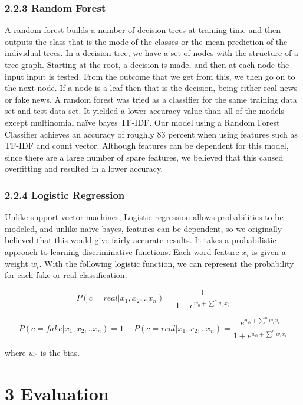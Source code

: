 \documentclass{neu_handout}
\begin{document}
\subsubsection*{2.2.3 Random Forest}

A random forest builds a number of decision trees at training time and then outputs the class that is the mode of the classes or the mean prediction of the individual trees. In a decision tree, we have a set of nodes with the structure of a tree graph. Starting at the root, a decision is made, and then at each node the input input is tested. From the outcome that we get from this, we then go on to the next node. If a node is a leaf then that is the decision, being either real news or fake news. A random forest was tried as a classifier for the same training data set and test data set. It
yielded a lower accuracy value than all of the models except multinomial na\"ive bayes TF-IDF. Our model using a Random Forest Classifier achieves an accuracy of roughly 83 percent when using features such as TF-IDF and count vector. Although features can be dependent for this model, since there are a large number of spare features, we believed that this caused overfitting and resulted in a lower accuracy.
 
 
\subsubsection*{2.2.4 Logistic Regression}
Unlike support vector machines, Logistic regression allows probabilities to be modeled, and unlike na\"ive bayes, features can be dependent, so we originally believed that this would give fairly accurate results. It takes a probabilistic approach to learning discriminative functions. Each word feature $x_i$ is given a weight $w_i$. With the following logistic function, we can represent the probability for each fake or real classification:

$$P(c = real | x_1, x_2,..x_n) = \frac{1}{1 + e^{w_0 + \sum^n w_i x_i}} $$

$$P(c = fake | x_1, x_2,..x_n) = 1 - P(c = real | x_1, x_2,..x_n) = \frac{e^{w_0 + \sum^n w_i x_i}}{1+e^{w_0 + \sum^n w_i x_i}}$$

where $w_0$ is the bias.

\section*{3 Evaluation}
\end{document}
